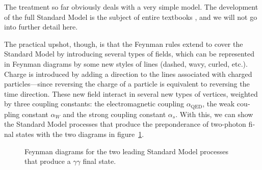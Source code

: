 \begin{english}
The treatment so far obviously deals with a very simple model. The development of the full Standard Model is the subject of entire textbooks \cite{srednicki}, and we will not go into further detail here.

The practical upshot, though, is that the Feynman rules extend to cover the Standard Model by introducing several types of fields, which can be represented in Feynman diagrams by some new styles of lines (dashed, wavy, curled, etc.). Charge is introduced by adding a direction to the lines associated with charged particles---since reversing the charge of a particle is equivalent to reversing the time direction. These new field interact in several new types of vertices, weighted by three coupling constants: the electromagnetic coupling $\alpha_\text{QED}$, the weak coupling constant $\alpha_W$ and the strong coupling constant $\alpha_s$. With this, we can show the Standard Model processes that produce the preponderance of two-photon final states with the two diagrams in figure~\ref{smfeyn}.


\begin{figure}[htb]
\parbox[t]{.45\textwidth}{\begin{center}\begin{footnotesize}
\end{footnotesize}\end{center}
}\hfill
\parbox[t]{.52\textwidth}{\begin{center}\begin{footnotesize}
\end{footnotesize}\end{center}
}\hfill
\caption{ Feynman diagrams for the two leading Standard Model processes that produce a $\gamma\gamma$ final state.\label{smfeyn}}
\end{figure}


\end{english}
